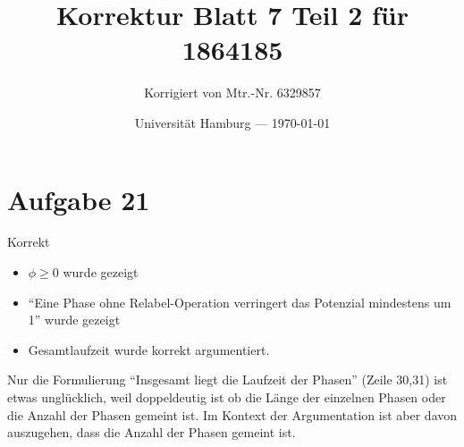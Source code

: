 \documentclass[parskip=half,a4paper]{scrartcl}
\title{Korrektur Blatt 7 Teil 2 für 1864185}
\author{Korrigiert von Mtr.-Nr. 6329857}
\date{Universität Hamburg --- \today}
\begin{document}
\maketitle %

\section{Aufgabe 21}

Korrekt

\begin{itemize}
    \item $\phi \ge 0$ wurde gezeigt
    \item \enquote{Eine Phase ohne Relabel-Operation verringert das Potenzial mindestens um 1} wurde gezeigt
    \item Gesamtlaufzeit wurde korrekt argumentiert.
\end{itemize}

Nur die Formulierung \enquote{Insgesamt liegt die Laufzeit der Phasen} (Zeile 30,31) ist etwas unglücklich, weil doppeldeutig ist ob die Länge der einzelnen Phasen oder die Anzahl der Phasen gemeint ist. Im Kontext der Argumentation ist aber davon auszugehen, dass die Anzahl der Phasen gemeint ist.
\end{document}
